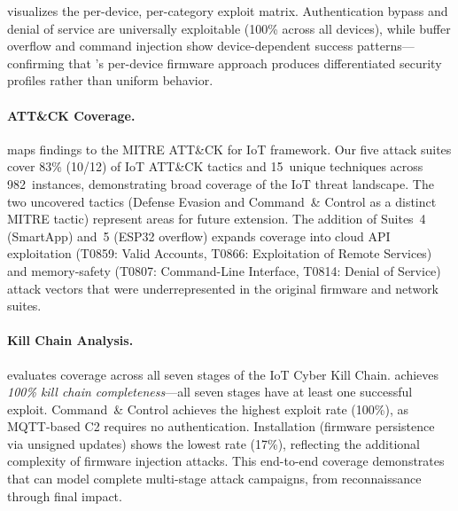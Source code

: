 

 visualizes the per-device, per-category
exploit matrix.  Authentication bypass and denial of service are
universally exploitable (100\% across all devices), while buffer
overflow and command injection show device-dependent success
patterns---confirming that \sys{}'s per-device firmware approach
produces differentiated security profiles rather than uniform
behavior.



\paragraph{ATT\&CK Coverage.}
 maps findings to the MITRE ATT\&CK for
IoT framework.  Our five attack suites cover 83\% (10/12) of IoT
ATT\&CK tactics and 15~unique techniques across 982~instances,
demonstrating broad coverage of the IoT threat landscape.  The two
uncovered tactics (Defense Evasion and Command~\& Control as a
distinct MITRE tactic) represent areas for future extension.
The addition of Suites~4 (SmartApp) and~5 (ESP32 overflow) expands
coverage into cloud API exploitation (T0859: Valid Accounts,
T0866: Exploitation of Remote Services) and memory-safety
(T0807: Command-Line Interface, T0814: Denial of Service) attack
vectors that were underrepresented in the original firmware and
network suites.



\paragraph{Kill Chain Analysis.}
 evaluates coverage across all seven stages
of the IoT Cyber Kill Chain.  \sys{} achieves \emph{100\% kill chain
completeness}---all seven stages have at least one successful exploit.
Command~\& Control achieves the highest exploit rate (100\%), as
MQTT-based C2 requires no authentication.  Installation (firmware
persistence via unsigned updates) shows the lowest rate (17\%),
reflecting the additional complexity of firmware injection attacks.
This end-to-end coverage demonstrates that \sys{} can model complete
multi-stage attack campaigns, from reconnaissance through final
impact.



